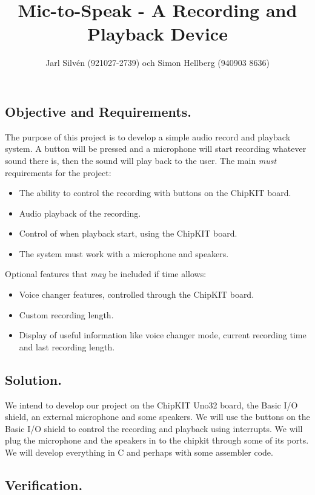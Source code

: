 \documentclass[a4paper,11pt,twoside]{article}
\title{Mic-to-Speak - A Recording and Playback Device}
\author{Jarl Silvén (921027-2739) och Simon Hellberg (940903 8636)}
\date{\thedate}
\begin{document}
\maketitle

\newpage

\subsection*{Objective and Requirements.}

The purpose of this project is to develop a simple audio record and playback system. A button will be pressed and a microphone will start recording whatever sound there is, then the sound will play back to the user. 
The main \emph{must} requirements for the project:
\begin{itemize}
\item The ability to control the recording with buttons on the ChipKIT board.
\item Audio playback of the recording.
\item Control of when playback start, using the ChipKIT board.
\item The system must work with a microphone and speakers.
\end{itemize}
Optional features that \emph{may} be included if time allows:
\begin{itemize}
\item Voice changer features, controlled through the ChipKIT board.
\item Custom recording length.
\item Display of useful information like voice changer mode, current recording time and last recording length.
\end{itemize}

\subsection*{Solution.}

We intend to develop our project on the ChipKIT Uno32 board, the Basic I/O shield, an external microphone and some speakers. We will use the buttons on the Basic I/O shield to control the recording and playback using interrupts. We will plug the microphone and the speakers in to the chipkit through some of its ports. We will develop everything in C and perhaps with some assembler code.

\subsection*{Verification.}
\end{document}
